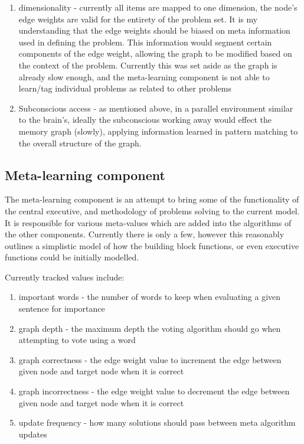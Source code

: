 \begin{enumerate}     
	\item dimensionality - currently all items are mapped to one dimension, the 
	node's edge weights are valid for the entirety of the problem set.  It is my
	understanding that the edge weights should be biased on meta information 
	used in defining the problem.  This information would segment certain 
	components of the edge weight, allowing the graph to be modified based on 
	the context of the problem.  Currently this was set aside as the graph is 
	already slow enough, and the meta-learning component is not able to 
	learn/tag individual problems as related to other problems    
	\item Subconscious access - as mentioned above, in a parallel environment 
	similar to the brain's, ideally the subconscious working away would effect 
	the memory graph (slowly), applying information learned in pattern matching 
	to the overall structure of the graph.
\end{enumerate}

\subsection{Meta-learning component} 

The meta-learning component is an attempt
to bring some of the functionality of the central executive, and methodology of
problems solving to the current model. It is responsible for various meta-values
which are added into the algorithms of the other components. Currently there is
only a few, however this reasonably outlines a simplistic model of how the
building block functions, or even executive functions could be initially
modelled.

Currently tracked values include:

\begin{enumerate}     
	\item important words - the number of words to keep when evaluating a given 
	sentence for importance     
	\item graph depth - the maximum depth the voting algorithm should go when 
	attempting to vote using a word 
	\item graph correctness - the edge weight value to increment the edge 
	between given node and target node when it is correct     
	\item graph incorrectness - the edge weight value to decrement the edge 
	between given node and target node when it is correct     
	\item update frequency - how many solutions should pass between meta 
	algorithm updates 
\end{enumerate}


